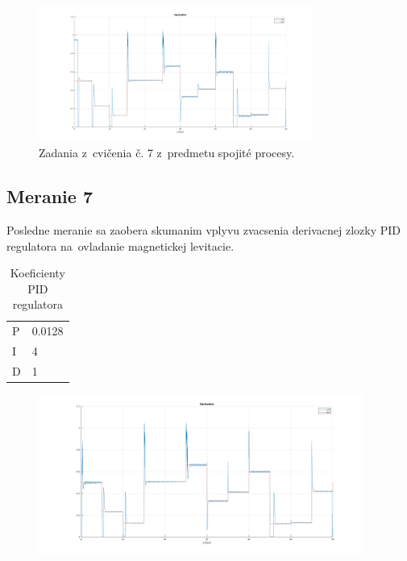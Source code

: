 \documentclass{article}
\begin{document}
\begin{figure}[!htbp]
	\begin{center}
		\includegraphics[width=0.8\textwidth]{./include/m6.png}
	\end{center}
	\caption{Zadania z~cvičenia č. 7 z~predmetu spojité procesy.}
	\label{fig:meranie6}
\end{figure}



\subsection{Meranie 7}
\label{sec:meranie6}

Posledne meranie sa zaobera skumanim vplyvu zvacsenia derivacnej zlozky PID regulatora na~ovladanie magnetickej levitacie.



\begin{table}[!htbp]
	\caption{Koeficienty PID regulatora}
	\label{tab:t6}
	\begin{center}
		\begin{tabular}[c]{|l|l|}
			\hline

			P & 0.0128 \\
			I & 4 \\
			D & 1 \\
			\hline
		\end{tabular}
	\end{center}
\end{table}

\begin{figure}
	\begin{center}
		\includegraphics[width=0.95\textwidth]{include/m7.png}
	\end{center}
	\caption{}
	\label{fig:}
\end{figure}
\end{document}
